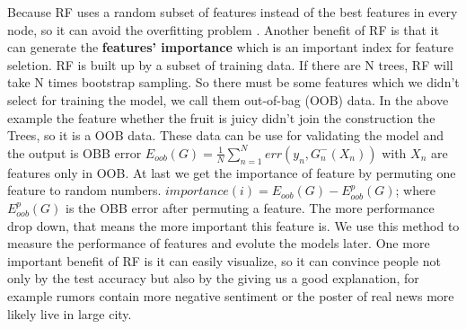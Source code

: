 Because RF uses a random subset of features instead of the best features in every node, so it can avoid the overfitting problem \cite{breiman2001random}. Another benefit of RF is that it can generate the \textbf{features' importance} which is an important index for feature seletion. RF is built up by a subset of training data. If there are N trees, RF will take N times bootstrap sampling. So there must be some features which we didn't select for training the model, we call them out-of-bag (OOB) data. In the above example the feature whether the fruit is juicy didn't join the construction the Trees, so it is a OOB data. These data can be use for validating the model and the output is OBB error $E_{oob}(G) = \frac {1}{N} \sum_{n=1}^{N}err(y_n,G_{n}^-(X_n))$ with $X_n$ are features only in OOB. At last we get the importance of feature by permuting one feature to random numbers. $importance(i)= E_{oob}(G)-E_{oob}^{p}(G)$; where $E_{oob}^{p}(G)$ is the OBB error after permuting a feature. The more performance drop down, that means the more important this feature is. We use this method to measure the performance of features and evolute the models later. 
One more important benefit of RF is it can easily visualize, so it can convince people not only by the test accuracy but also by the giving us a good explanation, for example rumors contain more negative sentiment or the poster of real news more likely live in large city. 


